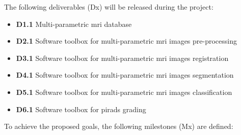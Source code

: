 The following deliverables (Dx) will be released during the project:

\begin{itemize}[noitemsep]
\item[] \textbf{D1.1} Multi-parametric \ac{mri} database
\item[] \textbf{D2.1} Software toolbox for multi-parametric \ac{mri} images pre-processing
\item[] \textbf{D3.1} Software toolbox for multi-parametric \ac{mri} images registration
\item[] \textbf{D4.1} Software toolbox for multi-parametric \ac{mri} images segmentation
\item[] \textbf{D5.1} Software toolbox for multi-parametric \ac{mri} images classification
\item[] \textbf{D6.1} Software toolbox for \ac{pirads} grading
\end{itemize}

To achieve the proposed goals, the following milestones (Mx) are defined:

